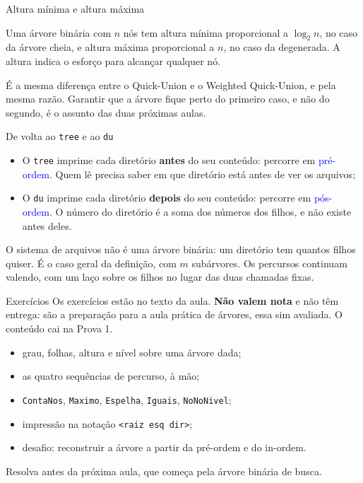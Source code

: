 \documentclass{beamer}
\newcommand{\tcb}[1]{\textcolor{blue}{#1}}
\begin{document}
\begin{frame}{Altura mínima e altura máxima}
  \begin{block}{}
    Uma árvore binária com $n$ nós tem altura mínima proporcional a $\log_2 n$,
    no caso da árvore cheia, e altura máxima proporcional a $n$, no caso da
    degenerada. A altura indica o esforço para alcançar qualquer nó.
  \end{block}

  \vspace{0.5cm}
  É a mesma diferença entre o Quick-Union e o Weighted Quick-Union, e pela mesma
  razão. Garantir que a árvore fique perto do primeiro caso, e não do segundo, é
  o assunto das duas próximas aulas.
\end{frame}

\begin{frame}{De volta ao \texttt{tree} e ao \texttt{du}}
  \begin{itemize}
    \item O \texttt{tree} imprime cada diretório \textbf{antes} do seu conteúdo:
          percorre em \tcb{pré-ordem}. Quem lê precisa saber em que diretório
          está antes de ver os arquivos;
    \item O \texttt{du} imprime cada diretório \textbf{depois} do seu conteúdo:
          percorre em \tcb{pós-ordem}. O número do diretório é a soma dos
          números dos filhos, e não existe antes deles.
  \end{itemize}

  \vspace{0.5cm}
  O sistema de arquivos não é uma árvore binária: um diretório tem quantos
  filhos quiser. É o caso geral da definição, com $m$ subárvores. Os percursos
  continuam valendo, com um laço sobre os filhos no lugar das duas chamadas
  fixas.
\end{frame}

\begin{frame}{Exercícios}
  Os exercícios estão no texto da aula. \textbf{Não valem nota} e não têm
  entrega: são a preparação para a aula prática de árvores, essa sim avaliada.
  O conteúdo cai na Prova 1.

  \vspace{0.4cm}
  \begin{itemize}
    \item grau, folhas, altura e nível sobre uma árvore dada;
    \item as quatro sequências de percurso, à mão;
    \item \texttt{ContaNos}, \texttt{Maximo}, \texttt{Espelha},
          \texttt{Iguais}, \texttt{NoNoNivel};
    \item impressão na notação \texttt{<raiz esq dir>};
    \item desafio: reconstruir a árvore a partir da pré-ordem e do in-ordem.
  \end{itemize}

  \vspace{0.4cm}
  Resolva antes da próxima aula, que começa pela árvore binária de busca.
\end{frame}
\end{document}

